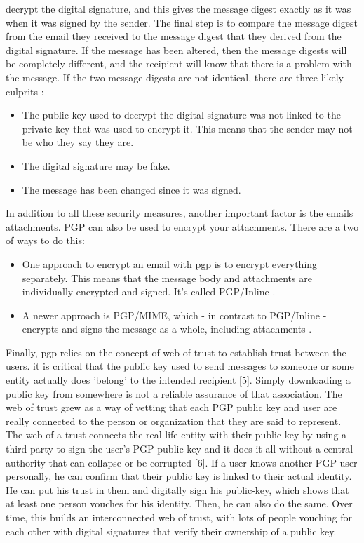 decrypt the digital signature, and this gives the message digest exactly as it was when it was signed by the sender. The final step is to compare the message digest from the email they received to the message digest that they derived from the digital signature. If the message has been altered, then the message digests will be completely different, and the recipient will know that there is a problem with the message. If the two message digests are not identical, there are three likely culprits \cite{pgpTech}:
\begin{itemize}
	\item The public key used to decrypt the digital signature was not linked to the private key that was used to encrypt it. This means that the sender may not be who they say they are.
	\item The digital signature may be fake.
	\item The message has been changed since it was signed.
\end{itemize}
In addition to all these security measures, another important factor is the emails attachments. PGP can also be used to encrypt your attachments. There are a two of ways to do this:
\begin{itemize}
	\item One approach to encrypt an email with \acrshort{pgp} is to encrypt everything separately. This means that the message body and attachments are individually encrypted and signed. It’s called PGP/Inline \cite{pgpAttachements}.
	\item A newer approach is PGP/MIME, which - in contrast to PGP/Inline - encrypts and signs the message as a whole, including attachments \cite{pgpAttachements}.
\end{itemize}
Finally, \acrshort{pgp} relies on the concept of web of trust to establish trust between the users. it is critical that the public key used to send messages to someone or some entity actually does 'belong' to the intended recipient [5]. Simply downloading a public key from somewhere is not a reliable assurance of that association. The web of trust grew as a way of vetting that each PGP public key and user are really connected to the person or organization that they are said to represent. The web of a trust connects the real-life entity with their public key by using a third party to sign the user’s PGP public-key and it does it all without a central authority that can collapse or be corrupted [6]. If a user knows another PGP user personally, he can confirm that their public key is linked to their actual identity. He can put his trust in them and digitally sign his public-key, which shows that at least one person vouches for his identity. Then, he can also do the same. Over time, this builds an interconnected web of trust, with lots of people vouching for each other with digital signatures that verify their ownership of a public key.

